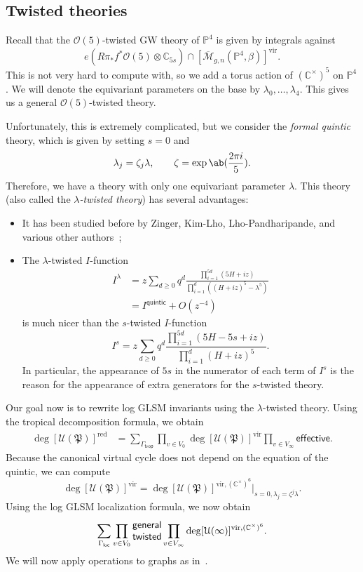 \documentclass[10pt,oldfontcommands,oneside]{memoir}
\theoremstyle{definition}
\theoremstyle{remark}
\theoremstyle{plain}
\theoremstyle{definition}
\theoremstyle{remark}
\newcommand{\C}{\mathbb{C}}
\renewcommand{\P}{\mathbb{P}}
\newcommand{\Mbar}{\overline{\mathcal{M}}}
\newcommand{\mc}[1]{\mathcal{#1}}
\newcommand{\mf}[1]{\mathfrak{#1}}
\newcommand{\mr}[1]{\mathrm{#1}}
\newcommand{\ms}[1]{\mathsf{#1}}
\newcommand{\1}{\mathbf{1}}
\newcommand{\2}{\mathbf{2}}
\newcommand{\3}{\mathbf{3}}
\newcommand{\vir}{\mr{vir}}
\newcommand{\red}{\mr{red}}
\begin{document}
\subsection{Twisted theories}%
\label{sub:Twisted theory}

Recall that the $\mc{O}(5)$-twisted GW theory of $\P^4$ is given by integrals against
\[ e(R\pi_* f^* \mc{O}(5) \otimes \C_{5s}) \cap [\Mbar_{g,n}(\P^4, \beta)]^{\vir}. \]
This is not very hard to compute with, so we add a torus action of $(\C^{\times})^5$ on $\P^4$. We will denote the equivariant parameters on the base by $\lambda_0, \ldots, \lambda_4$. This gives us a general $\mc{O}(5)$-twisted theory.

Unfortunately, this is extremely complicated, but we consider the \textit{formal quintic} theory, which is given by setting $s=0$ and
\[ \lambda_j = \zeta_j \lambda, \qquad \zeta = \exp\ab(\frac{2\pi i}{5}). \]
Therefore, we have a theory with only one equivariant parameter $\lambda$. This theory (also called the \textit{$\lambda$-twisted theory}) has several advantages:
\begin{itemize}
    \item It has been studied before by Zinger, Kim-Lho, Lho-Pandharipande, and various other authors~\cite{reducedgenus1,kimlho,sqhae};
    \item The $\lambda$-twisted $I$-function
        \begin{align*}
            I^{\lambda}&=  z \sum_{d \geq 0} q^d \frac{\prod_{i=1}^{5d} (5H+iz)}{\prod_{i=1}^d ((H+iz)^5 - \lambda^5)} \\
            &= I^{\ms{quintic}} + O(z^{-4})
        \end{align*}
        is much nicer than the $s$-twisted $I$-function
        \[ I^{s}=  z \sum_{d \geq 0} q^d \frac{\prod_{i=1}^{5d} (5H - 5s+iz)}{\prod_{i=1}^d (H+iz)^5}. \]
        In particular, the appearance of $5s$ in the numerator of each term of $I^s$ is the reason for the appearance of extra generators for the $s$-twisted theory.
\end{itemize}

Our goal now is to rewrite log GLSM invariants using the $\lambda$-twisted theory. Using the tropical decomposition formula, we obtain
\begin{align*}
    \deg [\mc{U}(\mf{P})]^{\red} &= \sum_{\Gamma_{\ms{trop}}} \prod_{v \in V_0} \deg [\mc{U}(\mf{P})]^{\vir} \prod_{v \in V_{\infty}} \ms{effective}.
\end{align*}
Because the canonical virtual cycle does not depend on the equation of the quintic, we can compute
\[ \deg [\mc{U}(\mf{P})]^{\vir} = \deg [\mc{U}(\mf{P})]^{\vir, (\C^{\times})^6} |_{s=0,\lambda_j = \zeta^j \lambda}. \]
Using the log GLSM localization formula, we now obtain
\[ \sum_{\Gamma_{\ms{loc}}} \prod_{v \in V_0} \Centerstack{\textsf{general} \textsf{twisted}} \prod_{v \in V_{\infty}} \deg [\mc{U}(\infty)]^{\vir, (\C^{\times})^6}. \]
We will now apply operations to graphs as in~.
\end{document}

